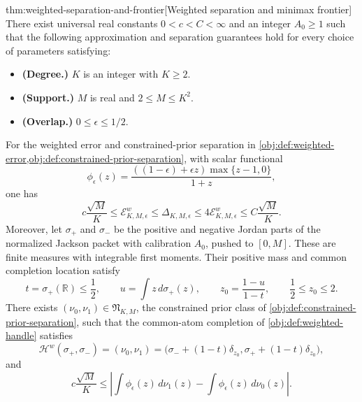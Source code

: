 \begin{theoremv}{thm:weighted-separation-and-frontier}[Weighted separation and minimax frontier]
There exist universal real constants \(0<c<C<\infty\) and an integer \(A_0\geq1\) such that the following approximation and separation guarantees hold for every choice of parameters satisfying:
\begin{itemize}
\item \textbf{(Degree.)} \(K\) is an integer with \(K\geq2\).
\item \textbf{(Support.)} \(M\) is real and \(2\leq M\leq K^2\).
\item \textbf{(Overlap.)} \(0\leq\epsilon\leq1/2\).
\end{itemize}
For the weighted error and constrained-prior separation in
\cref{obj:def:weighted-error,obj:def:constrained-prior-separation}, with scalar functional
\[
\phi_\epsilon(z)=
\frac{((1-\epsilon)+\epsilon z)\max\{z-1,0\}}{1+z},
\]
one has
\[
c\frac{\sqrt M}{K}
\leq \mathcal E_{K,M,\epsilon}^{w}
\leq \Delta_{K,M,\epsilon}
\leq 4\mathcal E_{K,M,\epsilon}^{w}
\leq C\frac{\sqrt M}{K}.
\]
Moreover, let \(\sigma_+\) and \(\sigma_-\) be the positive and negative Jordan parts of the normalized Jackson packet with calibration \(A_0\), pushed to \([0,M]\). These are finite measures with integrable first moments. Their positive mass and common completion location satisfy
\[
t=\sigma_+(\mathbb R)\leq\frac12,
\qquad
u=\int z\,d\sigma_+(z),
\qquad
z_0=\frac{1-u}{1-t},
\qquad
\frac12\leq z_0\leq2.
\]
There exists \((\nu_0,\nu_1)\in\mathfrak N_{K,M}\), the constrained prior class of \cref{obj:def:constrained-prior-separation}, such that the common-atom completion of \cref{obj:def:weighted-handle} satisfies
\[
\mathscr H^w(\sigma_+,\sigma_-)
=(\nu_0,\nu_1)
=\bigl(\sigma_-+(1-t)\delta_{z_0},
       \sigma_++(1-t)\delta_{z_0}\bigr),
\]
and
\[
c\frac{\sqrt M}{K}
\leq
\left|
\int\phi_\epsilon(z)\,d\nu_1(z)
-
\int\phi_\epsilon(z)\,d\nu_0(z)
\right|.
\]


\end{theoremv}
